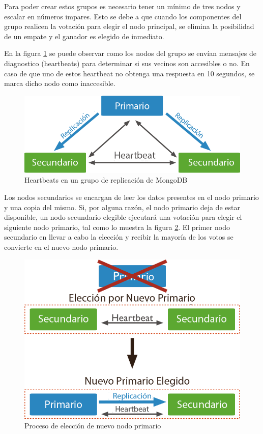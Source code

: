 Para poder crear estos grupos es necesario tener un mínimo de tres nodos y escalar en números impares. Esto se
debe a que cuando los componentes del grupo realicen la votación para elegir el nodo principal, se elimina la posibilidad de un
empate y el ganador es elegido de inmediato.

En la figura \ref{fig:heartbeat} se puede observar como los nodos del grupo se envían mensajes de diagnostico (heartbeats) para determinar si sus vecinos son accesibles o no.
En caso de que uno de estos heartbeat no obtenga una respuesta en 10 segundos, se marca dicho
nodo como inaccesible.

\begin{figure}[H]
	\centering
		\includegraphics[width=.6\textwidth]{figures/heartbeat}
	\caption{Heartbeats en un grupo de replicación de MongoDB}
	\label{fig:heartbeat}
\end{figure}


Los nodos secundarios se encargan de leer los datos presentes en el nodo primario y una copia del mismo.
Si, por alguna razón, el nodo primario deja de estar disponible, un nodo secundario elegible ejecutará una votación para elegir el siguiente nodo primario, tal como lo muestra la figura \ref{fig:failover}.
El primer nodo secundario en llevar a cabo la elección y recibir la mayoría de los votos se convierte en el nuevo nodo primario.

\begin{figure}[H]
	\centering
		\includegraphics[width=.6\textwidth]{figures/failover}
	\caption{Proceso de elección de nuevo nodo primario}
	\label{fig:failover}
\end{figure}

